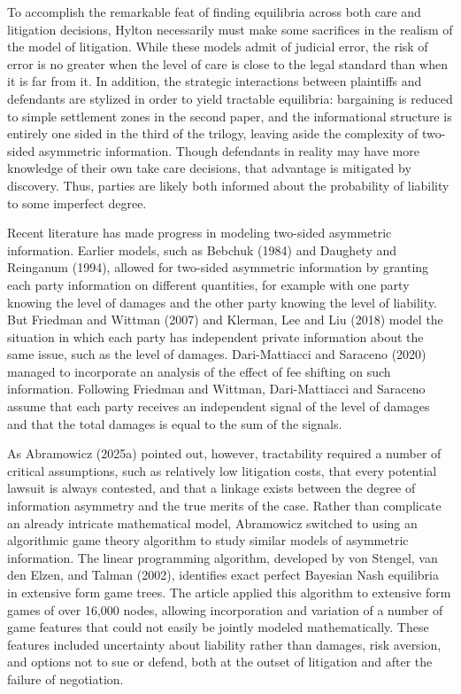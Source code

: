 \documentclass{article}
\begin{document}
To accomplish the remarkable feat of finding equilibria across both care and litigation decisions, Hylton necessarily must make some sacrifices in the realism of the model of litigation. While these models admit of judicial error, the risk of error is no greater when the level of care is close to the legal standard than when it is far from it. In addition, the strategic interactions between plaintiffs and defendants are stylized in order to yield tractable equilibria: bargaining is reduced to simple settlement zones in the second paper, and the informational structure is entirely one sided in the third of the trilogy, leaving aside the complexity of two-sided asymmetric information. Though defendants in reality may have more knowledge of their own take care decisions, that advantage is mitigated by discovery. Thus, parties are likely both informed about the probability of liability to some imperfect degree. 

Recent literature has made progress in modeling two-sided asymmetric information. Earlier models, such as Bebchuk (1984) and Daughety and Reinganum (1994), allowed for two-sided asymmetric information by granting each party information on different quantities, for example with one party knowing the level of damages and the other party knowing the level of liability. But Friedman and Wittman (2007) and Klerman, Lee and Liu (2018) model the situation in which each party has independent private information about the same issue, such as the level of damages. Dari-Mattiacci and Saraceno (2020) managed to incorporate an analysis of the effect of fee shifting on such information. Following Friedman and Wittman, Dari-Mattiacci and Saraceno assume that each party receives an independent signal of the level of damages and that the total damages is equal to the sum of the signals.

As Abramowicz (2025a) pointed out, however, tractability required a number of critical assumptions, such as relatively low litigation costs, that every potential lawsuit is always contested, and that a linkage exists between the degree of information asymmetry and the true merits of the case. Rather than complicate an already intricate mathematical model, Abramowicz switched to using an algorithmic game theory algorithm to study similar models of asymmetric information. The linear programming algorithm, developed by von Stengel, van den Elzen, and Talman (2002), identifies exact perfect Bayesian Nash equilibria in extensive form game trees. The article applied this algorithm to extensive form games of over 16,000 nodes, allowing incorporation and variation of a number of game features that could not easily be jointly modeled mathematically. These features included uncertainty about liability rather than damages, risk aversion, and options not to sue or defend, both at the outset of litigation and after the failure of negotiation.
\end{document}
